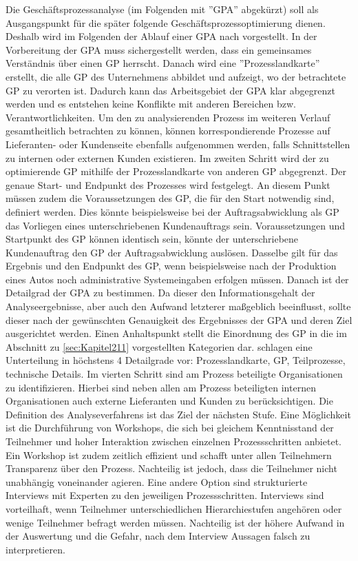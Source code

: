 Die Geschäftsprozessanalyse (im Folgenden mit ''GPA'' abgekürzt) soll als Ausgangspunkt für die später folgende Geschäftsprozessoptimierung dienen. Deshalb wird im Folgenden der Ablauf einer GPA nach \cite[][S. 63ff]{theorie_best_geschaftsprozesse_optimieren_2009} vorgestellt.
In der Vorbereitung der GPA muss sichergestellt werden, dass ein gemeinsames Verständnis über einen GP herrscht. Danach wird eine ''Prozesslandkarte'' erstellt, die alle GP des Unternehmens abbildet und aufzeigt, wo der betrachtete GP zu verorten ist. Dadurch kann das Arbeitsgebiet der GPA klar abgegrenzt werden und es entstehen keine Konflikte mit anderen Bereichen bzw. Verantwortlichkeiten. Um den zu analysierenden Prozess im weiteren Verlauf gesamtheitlich betrachten zu können, können korrespondierende Prozesse auf Lieferanten- oder Kundenseite ebenfalls aufgenommen werden, falls Schnittstellen zu internen oder externen Kunden existieren. 
Im zweiten Schritt wird der zu optimierende GP mithilfe der Prozesslandkarte von anderen GP abgegrenzt. Der genaue Start- und Endpunkt des Prozesses wird festgelegt. An diesem Punkt müssen zudem die Voraussetzungen des GP, die für den Start notwendig sind, definiert werden. Dies könnte beispielsweise bei der Auftragsabwicklung als GP das Vorliegen eines unterschriebenen Kundenauftrags sein. Voraussetzungen und Startpunkt des GP können identisch sein, \zB könnte der unterschriebene Kundenauftrag den GP der Auftragsabwicklung auslösen. Dasselbe gilt für das Ergebnis und den Endpunkt des GP, wenn beispielsweise nach der Produktion eines Autos noch administrative Systemeingaben erfolgen müssen.
Danach ist der Detailgrad der GPA zu bestimmen. Da dieser den Informationsgehalt der Analyseergebnisse, aber auch den Aufwand letzterer ma\ss geblich beeinflusst, sollte dieser nach der gewünschten Genauigkeit des Ergebnisses der GPA und deren Ziel ausgerichtet werden. Einen Anhaltspunkt stellt die Einordnung des GP in die im Abschnitt zu \ref{sec:Kapitel211} vorgestellten Kategorien dar. \cite{theorie_best_geschaftsprozesse_optimieren_2009} schlagen eine Unterteilung in höchstens 4 Detailgrade vor: Prozesslandkarte, GP, Teilprozesse, technische Details.
Im vierten Schritt sind am Prozess beteiligte Organisationen zu identifizieren. Hierbei sind neben allen am Prozess beteiligten internen Organisationen auch externe Lieferanten und Kunden zu berücksichtigen.
Die Definition des Analyseverfahrens ist das Ziel der nächsten Stufe. Eine Möglichkeit ist die Durchführung von Workshops, die sich bei gleichem Kenntnisstand der Teilnehmer und hoher Interaktion zwischen einzelnen Prozessschritten anbietet. Ein Workshop ist zudem zeitlich effizient und schafft unter allen Teilnehmern Transparenz über den Prozess. Nachteilig ist jedoch, dass die Teilnehmer nicht unabhängig voneinander agieren. Eine andere Option sind strukturierte Interviews mit Experten zu den jeweiligen Prozessschritten. Interviews sind vorteilhaft, wenn Teilnehmer unterschiedlichen Hierarchiestufen angehören oder wenige Teilnehmer befragt werden müssen. Nachteilig ist der höhere Aufwand in der Auswertung und die Gefahr, nach dem Interview Aussagen falsch zu interpretieren.
